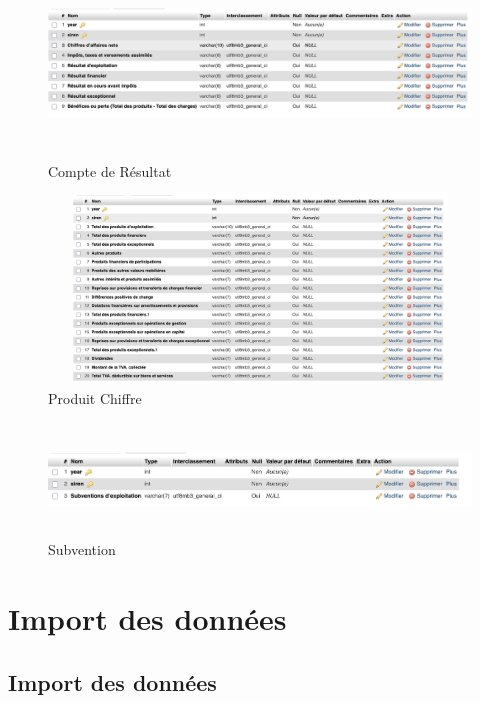 \documentclass[mstat,12pt]{unswthesis}
\begin{document}
\begin{figure}
\centering
\includegraphics[width=15cm,height=5cm]{image_sql/compte_resulta.png}
\caption{Compte de Résultat}\label{compte_resulta}
\end{figure}

\begin{figure}
\centering
\includegraphics[width=15cm,height=5cm]{image_sql/produit_chiffre.png}
\caption{Produit Chiffre}\label{produit_chiffre}
\end{figure}

\begin{figure}
\centering
\includegraphics[width=15cm,height=3cm]{image_sql/subvention.png}
\caption{Subvention}\label{subvention}
\end{figure}

\newpage

\bigskip

\section{Import des données}\label{import-des-donnuxe9es}

\subsection{Import des données}\label{import-des-donnuxe9es-1}
\end{document}
